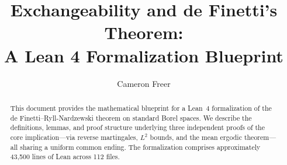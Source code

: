\documentclass[letter]{article}
\title{Exchangeability and de Finetti's Theorem:\\A Lean 4 Formalization Blueprint}
\author{Cameron Freer}
\date{}
\begin{document}
\maketitle

\begin{abstract}
This document provides the mathematical blueprint for a Lean~4 formalization of
the de Finetti--Ryll-Nardzewski theorem on standard Borel spaces.
We describe the definitions, lemmas, and proof structure underlying three
independent proofs of the core implication---via reverse martingales,
$L^2$ bounds, and the mean ergodic theorem---all sharing a uniform common ending.
The formalization comprises approximately 43,500 lines of Lean across 112 files.
\end{abstract}

{\small\tableofcontents}

\bigskip





\end{document}
